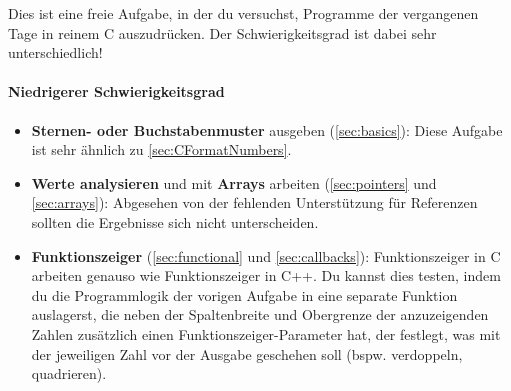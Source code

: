 \optionaltextbox

Dies ist eine freie Aufgabe, in der du versuchst, Programme der vergangenen Tage in reinem C auszudrücken.
Der Schwierigkeitsgrad ist dabei sehr unterschiedlich!

\paragraph{Niedrigerer Schwierigkeitsgrad}
\begin{itemize}
\item
\textbf{Sternen- oder Buchstabenmuster} ausgeben (\ref{sec:basics}):
Diese Aufgabe ist sehr ähnlich zu \ref{sec:CFormatNumbers}.

\item
\textbf{Werte analysieren} und mit \textbf{Arrays} arbeiten (\ref{sec:pointers} und \ref{sec:arrays}):
Abgesehen von der fehlenden Unterstützung für Referenzen sollten die Ergebnisse sich nicht unterscheiden.

\item
\textbf{Funktionszeiger} (\ref{sec:functional} und \ref{sec:callbacks}):
Funktionszeiger in C arbeiten genauso wie Funktionszeiger in C++.
Du kannst dies testen, indem du die Programmlogik der vorigen Aufgabe in eine separate Funktion auslagerst, die neben der Spaltenbreite und Obergrenze der anzuzeigenden Zahlen zusätzlich einen Funktionszeiger-Parameter hat, der festlegt, was mit der jeweiligen Zahl vor der Ausgabe geschehen soll (bspw. verdoppeln, quadrieren).
\end{itemize}

